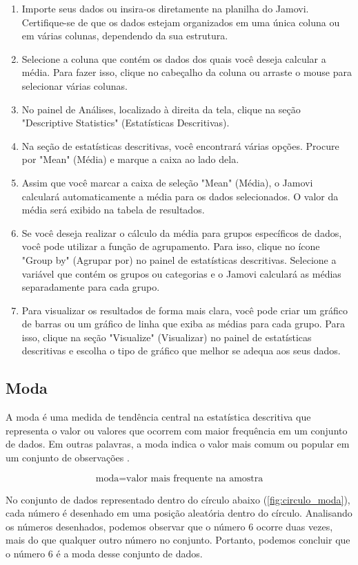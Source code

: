 \begin{enumerate}
    \item Importe seus dados ou insira-os diretamente na planilha do Jamovi. Certifique-se de que os dados estejam organizados em uma única coluna ou em várias colunas, dependendo da sua estrutura.
    \item Selecione a coluna que contém os dados dos quais você deseja calcular a média. Para fazer isso, clique no cabeçalho da coluna ou arraste o mouse para selecionar várias colunas.
    \item No painel de Análises, localizado à direita da tela, clique na seção "Descriptive Statistics" (Estatísticas Descritivas).
    \item Na seção de estatísticas descritivas, você encontrará várias opções. Procure por "Mean" (Média) e marque a caixa ao lado dela.
    \item Assim que você marcar a caixa de seleção "Mean" (Média), o Jamovi calculará automaticamente a média para os dados selecionados. O valor da média será exibido na tabela de resultados.
    \item Se você deseja realizar o cálculo da média para grupos específicos de dados, você pode utilizar a função de agrupamento. Para isso, clique no ícone "Group by" (Agrupar por) no painel de estatísticas descritivas. Selecione a variável que contém os grupos ou categorias e o Jamovi calculará as médias separadamente para cada grupo.
    \item Para visualizar os resultados de forma mais clara, você pode criar um gráfico de barras ou um gráfico de linha que exiba as médias para cada grupo. Para isso, clique na seção "Visualize" (Visualizar) no painel de estatísticas descritivas e escolha o tipo de gráfico que melhor se adequa aos seus dados.
\end{enumerate}

\subsection{Moda}

A moda é uma medida de tendência central na estatística descritiva que representa o valor ou valores que ocorrem com maior frequência em um conjunto de dados. Em outras palavras, a moda indica o valor mais comum ou popular em um conjunto de observações \parencite{Triola2017}.

\[
\text{moda} = \text{valor mais frequente na amostra}
\]

No conjunto de dados representado dentro do círculo abaixo (\ref{fig:circulo_moda}), cada número é desenhado em uma posição aleatória dentro do círculo. Analisando os números desenhados, podemos observar que o número 6 ocorre duas vezes, mais do que qualquer outro número no conjunto. Portanto, podemos concluir que o número 6 é a moda desse conjunto de dados.

